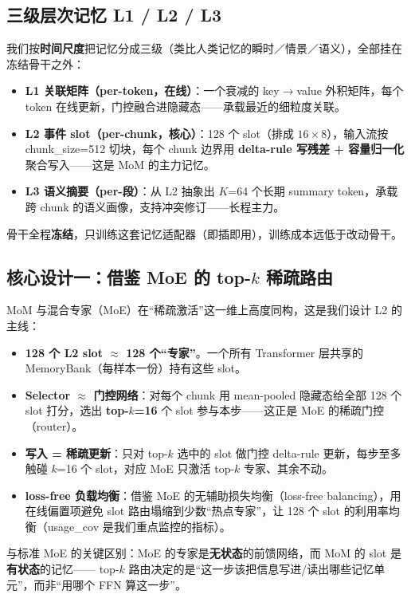 \documentclass[11pt,a4paper]{ctexart}
\begin{document}
\subsection{三级层次记忆 L1 / L2 / L3}
我们按\textbf{时间尺度}把记忆分成三级（类比人类记忆的瞬时／情景／语义），全部挂在冻结骨干之外：
\begin{itemize}
  \item \textbf{L1 关联矩阵（per-token，在线）}：一个衰减的 key$\to$value 外积矩阵，每个 token 在线更新，门控融合进隐藏态——承载最近的细粒度关联。
  \item \textbf{L2 事件 slot（per-chunk，核心）}：128 个 slot（排成 $16\times8$），输入流按 chunk\_size=512 切块，每个 chunk 边界用 \textbf{delta-rule 写残差 + 容量归一化} 聚合写入——这是 MoM 的主力记忆。
  \item \textbf{L3 语义摘要（per-段）}：从 L2 抽象出 $K$=64 个长期 summary token，承载跨 chunk 的语义画像，支持冲突修订——长程主力。
\end{itemize}
骨干全程\textbf{冻结}，只训练这套记忆适配器（即插即用），训练成本远低于改动骨干。

\subsection{核心设计一：借鉴 MoE 的 top-$k$ 稀疏路由}
MoM 与混合专家（MoE）在“稀疏激活”这一维上高度同构，这是我们设计 L2 的主线：
\begin{itemize}
  \item \textbf{128 个 L2 slot $\approx$ 128 个“专家”}。一个所有 Transformer 层共享的 MemoryBank（每样本一份）持有这些 slot。
  \item \textbf{Selector $\approx$ 门控网络}：对每个 chunk 用 mean-pooled 隐藏态给全部 128 个 slot 打分，选出 \textbf{top-$k$=16} 个 slot 参与本步——这正是 MoE 的稀疏门控（router）。
  \item \textbf{写入 = 稀疏更新}：只对 top-$k$ 选中的 slot 做门控 delta-rule 更新，每步至多触碰 $k$=16 个 slot，对应 MoE 只激活 top-$k$ 专家、其余不动。
  \item \textbf{loss-free 负载均衡}：借鉴 MoE 的无辅助损失均衡（loss-free balancing），用在线偏置项避免 slot 路由塌缩到少数“热点专家”，让 128 个 slot 的利用率均衡（usage\_cov 是我们重点监控的指标）。
\end{itemize}
与标准 MoE 的关键区别：MoE 的专家是\textbf{无状态}的前馈网络，而 MoM 的 slot 是\textbf{有状态}的记忆——
top-$k$ 路由决定的是“这一步该把信息写进/读出哪些记忆单元”，而非“用哪个 FFN 算这一步”。
\end{document}
